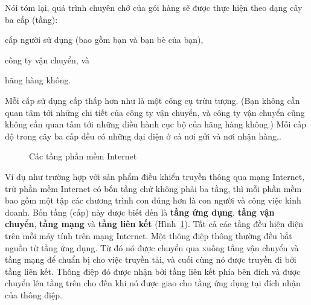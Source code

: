 Nói tóm lại, quá trình chuyên chở của gói hàng sẽ được thực hiện theo dạng cây ba cấp
(tầng):
\begin{inparaenum}[(a)]
\item cấp người sử dụng (bao gồm bạn và bạn bè của bạn),
\item công ty vận chuyển, và
\item hãng hàng không.
\end{inparaenum}
Mỗi cấp sử dụng cấp thấp hơn như là một công cụ trừu tượng. (Bạn không cần quan tâm tới
những chi tiết của công ty vận chuyển, và công ty vận chuyển cũng không cần quan tấm tới
những điều hành cục bộ của hãng hàng không.) Mỗi cấp độ trong cây ba cấp đều có những đại
diện ở cả nơi gửi và nơi nhận hàng,.

\begin{figure}[tbh]
  \centering {}
  \caption{Các tầng phần mềm Internet}
  \label{fig:fig4.13}
\end{figure}

Ví dụ như trường hợp với sản phẩm điều khiển truyền thông qua mạng Internet, trừ phần mềm
Internet có bốn tầng chứ không phải ba tầng, thì mỗi phần mềm bao gồm một tập các chương
trình con đúng hơn là con người và công việc kinh doanh. Bốn tầng (cấp) này được biết đến
là \textbf{tầng ứng dụng}, \textbf{tầng vận chuyển}, \textbf{tầng mạng} và \textbf{tầng
  liên kết} (Hình~\ref{fig:fig4.13}). Tất cả các tầng đều hiện diện trên mỗi máy tính trên
mạng Internet. Một thông điệp thông thường đều bắt nguồn từ tầng ứng dụng. Từ đó nó được
chuyển qua xuống tầng vận chuyển và tầng mạng để chuẩn bị cho việc truyền tải, và cuối
cùng nó được truyền đi bởi tầng liên kết. Thông điệp đó được nhận bởi tầng liên kết phía
bên đích và được chuyển lên tầng trên cho đến khi nó được giao cho tầng ứng dụng tại đích
nhận của thông điệp.

